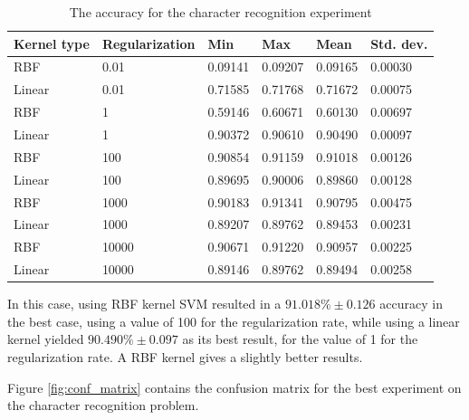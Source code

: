 \begin{table}[h]
\caption{The accuracy for the character recognition experiment}
\label{table:recog_values}
\begin{tabular}{llllll}
\hline
Kernel type & Regularization & Min     & Max     & Mean    & Std. dev. \\ \hline
RBF & 0.01 & 0.09141 & 0.09207 & 0.09165 & 0.00030 \\ 
Linear & 0.01 & 0.71585 & 0.71768 & 0.71672 & 0.00075 \\ 
RBF & 1 & 0.59146 & 0.60671 & 0.60130 & 0.00697 \\ 
Linear & 1 & 0.90372 & 0.90610 & 0.90490 & 0.00097 \\ 
RBF & 100 & 0.90854 & 0.91159 & 0.91018 & 0.00126 \\ 
Linear & 100 & 0.89695 & 0.90006 & 0.89860 & 0.00128 \\ 
RBF & 1000 & 0.90183 & 0.91341 & 0.90795 & 0.00475 \\ 
Linear & 1000 & 0.89207 & 0.89762 & 0.89453 & 0.00231 \\ 
RBF & 10000 & 0.90671 & 0.91220 & 0.90957 & 0.00225 \\ 
Linear & 10000 & 0.89146 & 0.89762 & 0.89494 & 0.00258 \\ \hline
\end{tabular}
\end{table}

In this case, using RBF kernel SVM resulted in a $ 91.018\% \pm 0.126 $ accuracy in the best case, using a value of 100 for the regularization rate, while using a linear kernel yielded $ 90.490\% \pm 0.097 $ as its best result, for the value of 1 for the regularization rate. A RBF kernel gives a slightly better results.

Figure \ref{fig:conf_matrix} contains the confusion matrix for the best experiment on the character recognition problem.



